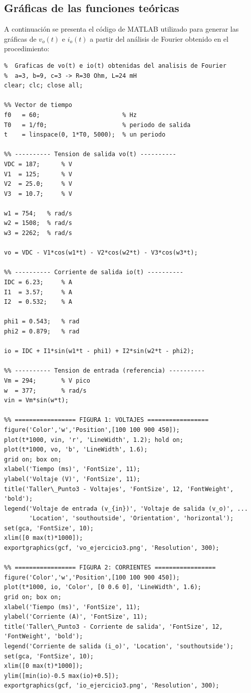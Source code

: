 \documentclass[12pt,a4paper]{article}
\begin{document}
\subsection{Gráficas de las funciones teóricas}

A continuación se presenta el código de MATLAB utilizado para generar las gráficas
de $v_o(t)$ e $i_o(t)$ a partir del análisis de Fourier obtenido en el procedimiento:

\begin{lstlisting}[caption={Código MATLAB para graficar $v_o(t)$ e $i_o(t)$ - Ejercicio 3}, label={lst:ejercicio3}]
%% Ejercicio 3 - Rectificador monofasico de onda completa tipo puente
%  Graficas de vo(t) e io(t) obtenidas del analisis de Fourier
%  a=3, b=9, c=3 -> R=30 Ohm, L=24 mH
clear; clc; close all;

%% Vector de tiempo
f0   = 60;                       % Hz
T0   = 1/f0;                     % periodo de salida
t    = linspace(0, 1*T0, 5000);  % un periodo

%% ---------- Tension de salida vo(t) ----------
VDC = 187;      % V
V1  = 125;      % V
V2  = 25.0;     % V
V3  = 10.7;     % V

w1 = 754;   % rad/s
w2 = 1508;  % rad/s
w3 = 2262;  % rad/s

vo = VDC - V1*cos(w1*t) - V2*cos(w2*t) - V3*cos(w3*t);

%% ---------- Corriente de salida io(t) ----------
IDC = 6.23;     % A
I1  = 3.57;     % A
I2  = 0.532;    % A

phi1 = 0.543;   % rad
phi2 = 0.879;   % rad

io = IDC + I1*sin(w1*t - phi1) + I2*sin(w2*t - phi2);

%% ---------- Tension de entrada (referencia) ----------
Vm = 294;       % V pico
w  = 377;       % rad/s
vin = Vm*sin(w*t);

%% ================= FIGURA 1: VOLTAJES =================
figure('Color','w','Position',[100 100 900 450]);
plot(t*1000, vin, 'r', 'LineWidth', 1.2); hold on;
plot(t*1000, vo, 'b', 'LineWidth', 1.6);
grid on; box on;
xlabel('Tiempo (ms)', 'FontSize', 11);
ylabel('Voltaje (V)', 'FontSize', 11);
title('Taller\_Punto3 - Voltajes', 'FontSize', 12, 'FontWeight', 'bold');
legend('Voltaje de entrada (v_{in})', 'Voltaje de salida (v_o)', ...
       'Location', 'southoutside', 'Orientation', 'horizontal');
set(gca, 'FontSize', 10);
xlim([0 max(t)*1000]);
exportgraphics(gcf, 'vo_ejercicio3.png', 'Resolution', 300);

%% ================= FIGURA 2: CORRIENTES =================
figure('Color','w','Position',[100 100 900 450]);
plot(t*1000, io, 'Color', [0 0.6 0], 'LineWidth', 1.6);
grid on; box on;
xlabel('Tiempo (ms)', 'FontSize', 11);
ylabel('Corriente (A)', 'FontSize', 11);
title('Taller\_Punto3 - Corriente de salida', 'FontSize', 12, 'FontWeight', 'bold');
legend('Corriente de salida (i_o)', 'Location', 'southoutside');
set(gca, 'FontSize', 10);
xlim([0 max(t)*1000]);
ylim([min(io)-0.5 max(io)+0.5]);
exportgraphics(gcf, 'io_ejercicio3.png', 'Resolution', 300);


\end{lstlisting}
\end{document}
